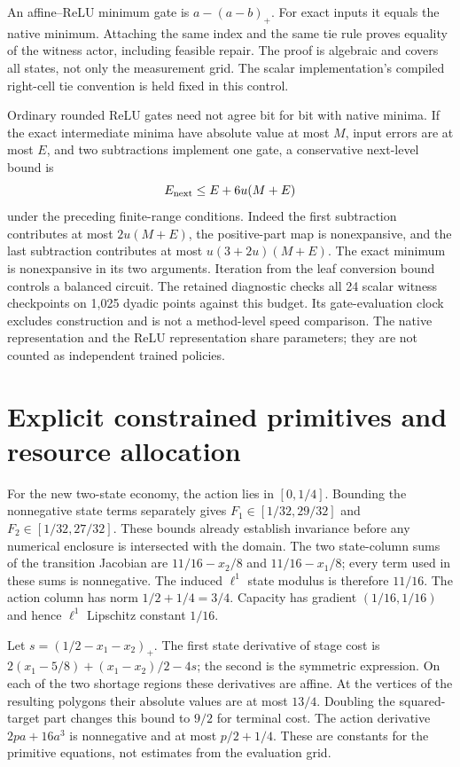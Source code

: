 An affine--ReLU minimum gate is $a-(a-b)_+$. For exact inputs it equals the native minimum. Attaching the same index and the same tie rule proves equality of the witness actor, including feasible repair. The proof is algebraic and covers all states, not only the measurement grid. The scalar implementation's compiled right-cell tie convention is held fixed in this control.

Ordinary rounded ReLU gates need not agree bit for bit with native minima. If the exact intermediate minima have absolute value at most $M$, input errors are at most $E$, and two subtractions implement one gate, a conservative next-level bound is
\[
 E_{\rm next}\le E+6u(M+E)
\]
under the preceding finite-range conditions. Indeed the first subtraction contributes at most $2u(M+E)$, the positive-part map is nonexpansive, and the last subtraction contributes at most $u(3+2u)(M+E)$. The exact minimum is nonexpansive in its two arguments. Iteration from the leaf conversion bound controls a balanced circuit. The retained diagnostic checks all 24 scalar witness checkpoints on 1,025 dyadic points against this budget. Its gate-evaluation clock excludes construction and is not a method-level speed comparison. The native representation and the ReLU representation share parameters; they are not counted as independent trained policies.

\section{Explicit constrained primitives and resource allocation}\label{supp:constrained47}
For the new two-state economy, the action lies in $[0,1/4]$. Bounding the nonnegative state terms separately gives $F_1\in[1/32,29/32]$ and $F_2\in[1/32,27/32]$. These bounds already establish invariance before any numerical enclosure is intersected with the domain. The two state-column sums of the transition Jacobian are $11/16-x_2/8$ and $11/16-x_1/8$; every term used in these sums is nonnegative. The induced $\ell^1$ state modulus is therefore $11/16$. The action column has norm $1/2+1/4=3/4$. Capacity has gradient $(1/16,1/16)$ and hence $\ell^1$ Lipschitz constant $1/16$.

Let $s=(1/2-x_1-x_2)_+$. The first state derivative of stage cost is $2(x_1-5/8)+(x_1-x_2)/2-4s$; the second is the symmetric expression. On each of the two shortage regions these derivatives are affine. At the vertices of the resulting polygons their absolute values are at most $13/4$. Doubling the squared-target part changes this bound to $9/2$ for terminal cost. The action derivative $2pa+16a^3$ is nonnegative and at most $p/2+1/4$. These are constants for the primitive equations, not estimates from the evaluation grid.

